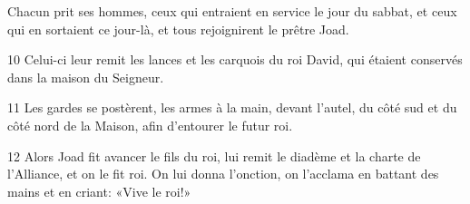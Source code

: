 
Chacun prit ses hommes, ceux qui entraient en service le jour du sabbat, et ceux qui en sortaient ce jour-là, et tous rejoignirent le prêtre Joad.

10 Celui-ci leur remit les lances et les carquois du roi David, qui étaient conservés dans la maison du Seigneur.

11 Les gardes se postèrent, les armes à la main, devant l’autel, du côté sud et du côté nord de la Maison, afin d’entourer le futur roi.

12 Alors Joad fit avancer le fils du roi, lui remit le diadème et la charte de l’Alliance, et on le fit roi. On lui donna l’onction, on l’acclama en battant des mains et en criant: «Vive le roi!»